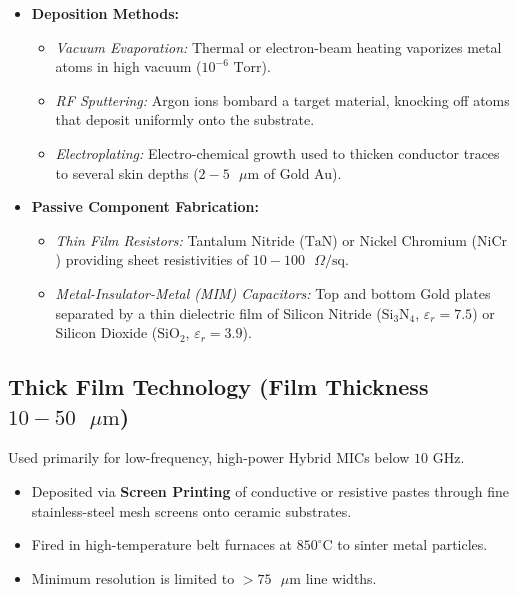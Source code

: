 \documentclass[12pt,a4paper]{article}
\begin{document}
\begin{itemize}[leftmargin=*, itemsep=4pt]
  \item \textbf{Deposition Methods:}
    \begin{itemize}[leftmargin=*, noitemsep]
      \item \textit{Vacuum Evaporation:} Thermal or electron-beam heating vaporizes metal atoms in high vacuum ($10^{-6}\text{ Torr}$).
      \item \textit{RF Sputtering:} Argon ions bombard a target material, knocking off atoms that deposit uniformly onto the substrate.
      \item \textit{Electroplating:} Electro-chemical growth used to thicken conductor traces to several skin depths ($2-5\text{ }\mu\text{m}$ of Gold Au).
    \end{itemize}
  \item \textbf{Passive Component Fabrication:}
    \begin{itemize}[leftmargin=*, noitemsep]
      \item \textit{Thin Film Resistors:} Tantalum Nitride ($\text{TaN}$) or Nickel Chromium ($\text{NiCr}$) providing sheet resistivities of $10 - 100\text{ }\Omega/\text{sq}$.
      \item \textit{Metal-Insulator-Metal (MIM) Capacitors:} Top and bottom Gold plates separated by a thin dielectric film of Silicon Nitride ($\text{Si}_3\text{N}_4$, $\varepsilon_r=7.5$) or Silicon Dioxide ($\text{SiO}_2$, $\varepsilon_r=3.9$).
    \end{itemize}
\end{itemize}

\subsection{Thick Film Technology (Film Thickness \texorpdfstring{$10 - 50\text{ }\mu\text{m}$}{10 - 50 um})}
Used primarily for low-frequency, high-power Hybrid MICs below $10\text{ GHz}$.
\begin{itemize}[leftmargin=*, itemsep=3pt]
  \item Deposited via \textbf{Screen Printing} of conductive or resistive pastes through fine stainless-steel mesh screens onto ceramic substrates.
  \item Fired in high-temperature belt furnaces at $850^\circ\text{C}$ to sinter metal particles.
  \item Minimum resolution is limited to $>75\text{ }\mu\text{m}$ line widths.
\end{itemize}
\end{document}
